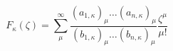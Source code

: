 \begin{equation}
F_{\kappa}(\zeta)=\sum^{\infty}_\mu \frac{(a_{1,\kappa})_{\mu}\dots
(a_{n,\kappa})_{\mu} }{(b_{1,\kappa})_{\mu}\dots (b_{n,\kappa})_{\mu}}
\frac{\zeta^{\mu}}{\mu!}
\end{equation}

